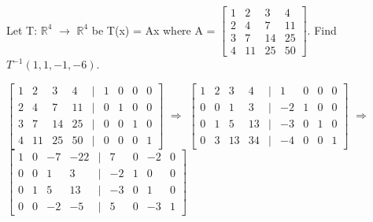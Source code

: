     \vspace{0.5cm}



    \begin{example}
        Let T: $\mathbb{R}^4$ $\rightarrow$ $\mathbb{R}^4$ be T(x) = Ax
        where A =
        \footnotesize
        $\begin{bmatrix}
            1 & 2 & 3 & 4 \\
            2 & 4 & 7 & 11 \\
            3 & 7 & 14 & 25 \\
            4 & 11 & 25 & 50
        \end{bmatrix}$.
        \normalsize
        Find $T^{-1}(1,1,-1,-6)$.
    \end{example}

    \begin{tbox}
        \scriptsize
        $\begin{bmatrix}
            1 & 2 & 3 & 4 & | & 1 & 0 & 0 & 0 \\
            2 & 4 & 7 & 11 & | & 0 & 1 & 0 & 0 \\
            3 & 7 & 14 & 25 & | & 0 & 0 & 1 & 0 \\
            4 & 11 & 25 & 50 & | & 0 & 0 & 0 & 1
        \end{bmatrix}$
        $\Rightarrow$
        $\begin{bmatrix}
            1 & 2 & 3 & 4 & | & 1 & 0 & 0 & 0 \\
            0 & 0 & 1 & 3 & | & -2 & 1 & 0 & 0 \\
            0 & 1 & 5 & 13 & | & -3 & 0 & 1 & 0 \\
            0 & 3 & 13 & 34 & | & -4 & 0 & 0 & 1
        \end{bmatrix}$
        $\Rightarrow$
        $\begin{bmatrix}
            1 & 0 & -7 & -22 & | & 7 & 0 & -2 & 0 \\
            0 & 0 & 1 & 3 & | & -2 & 1 & 0 & 0 \\
            0 & 1 & 5 & 13 & | & -3 & 0 & 1 & 0 \\
            0 & 0 & -2 & -5 & | & 5 & 0 & -3 & 1
        \end{bmatrix}$


\end{tbox}
